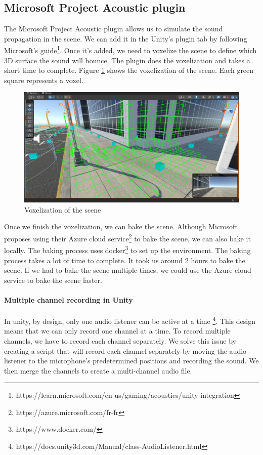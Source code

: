 \subsection{Microsoft Project Acoustic plugin}

The Microsoft Project Acoustic plugin allows us to simulate the sound propagation in the scene. We can add it in the Unity's plugin tab by following Microsoft's guide\footnote{https://learn.microsoft.com/en-us/gaming/acoustics/unity-integration}. Once it's added, we need to voxelize the scene to define which 3D surface the sound will bounce. The plugin does the voxelization and takes a short time to complete. Figure \ref{fig:simulation_voxelization} shows the voxelization of the scene. Each green square represents a voxel.

\begin{figure}[H]
    \centering
    \includegraphics[width=.8\textwidth]{images/simulation_voxelization.png}
    \caption{Voxelization of the scene}
    \label{fig:simulation_voxelization}
\end{figure}

Once we finish the voxelization, we can bake the scene. Although Microsoft proposes using their Azure cloud service\footnote{https://azure.microsoft.com/fr-fr} to bake the scene, we can also bake it locally. The baking process uses docker\footnote{https://www.docker.com/} to set up the environment. The baking process takes a lot of time to complete. It took us around 2 hours to bake the scene. If we had to bake the scene multiple times, we could use the Azure cloud service to bake the scene faster.

\paragraph{Multiple channel recording in Unity}

In unity, by design, only one audio listener can be active at a time \footnote{https://docs.unity3d.com/Manual/class-AudioListener.html}. This design means that we can only record one channel at a time. To record multiple channels, we have to record each channel separately. We solve this issue by creating a script that will record each channel separately by moving the audio listener to the microphone's predetermined positions and recording the sound. We then merge the channels to create a multi-channel audio file.

